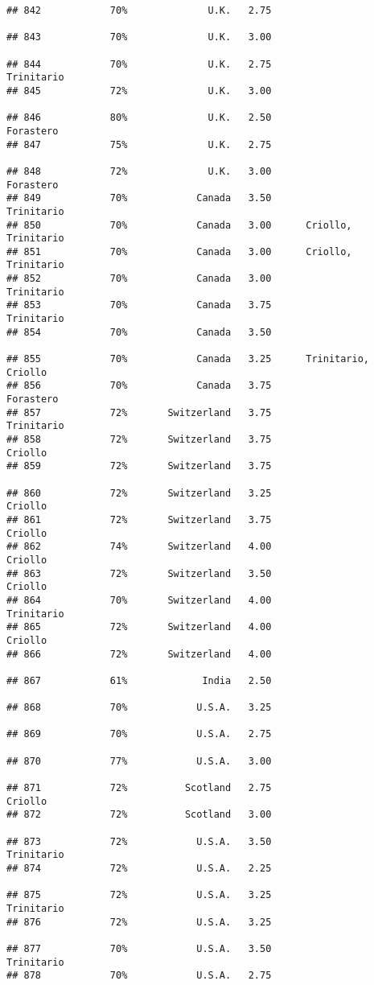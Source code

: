 \documentclass[
]{article}
\begin{document}
\begin{verbatim}
## 842            70%              U.K.   2.75                         
## 843            70%              U.K.   3.00                         
## 844            70%              U.K.   2.75               Trinitario
## 845            72%              U.K.   3.00                         
## 846            80%              U.K.   2.50                Forastero
## 847            75%              U.K.   2.75                         
## 848            72%              U.K.   3.00                Forastero
## 849            70%            Canada   3.50               Trinitario
## 850            70%            Canada   3.00      Criollo, Trinitario
## 851            70%            Canada   3.00      Criollo, Trinitario
## 852            70%            Canada   3.00               Trinitario
## 853            70%            Canada   3.75               Trinitario
## 854            70%            Canada   3.50                         
## 855            70%            Canada   3.25      Trinitario, Criollo
## 856            70%            Canada   3.75                Forastero
## 857            72%       Switzerland   3.75               Trinitario
## 858            72%       Switzerland   3.75                  Criollo
## 859            72%       Switzerland   3.75                         
## 860            72%       Switzerland   3.25                  Criollo
## 861            72%       Switzerland   3.75                  Criollo
## 862            74%       Switzerland   4.00                  Criollo
## 863            72%       Switzerland   3.50                  Criollo
## 864            70%       Switzerland   4.00               Trinitario
## 865            72%       Switzerland   4.00                  Criollo
## 866            72%       Switzerland   4.00                         
## 867            61%             India   2.50                         
## 868            70%            U.S.A.   3.25                         
## 869            70%            U.S.A.   2.75                         
## 870            77%            U.S.A.   3.00                         
## 871            72%          Scotland   2.75                  Criollo
## 872            72%          Scotland   3.00                         
## 873            72%            U.S.A.   3.50               Trinitario
## 874            72%            U.S.A.   2.25                         
## 875            72%            U.S.A.   3.25               Trinitario
## 876            72%            U.S.A.   3.25                         
## 877            70%            U.S.A.   3.50               Trinitario
## 878            70%            U.S.A.   2.75                         

\end{verbatim}
\end{document}

